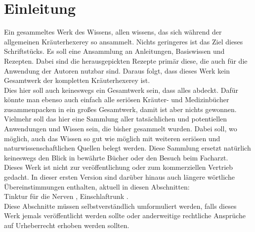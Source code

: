 \chapter{Einleitung}


Ein gesammeltes Werk des Wissens, allen wissens, das sich während der allgemeinen Kräuterhexerey so ansammelt. Nichts geringeres ist das Ziel dieses Schriftstücks. Es soll eine Ansammlung an Anleitungen, Basiswissen und Rezepten. Dabei sind die herausgepickten Rezepte primär diese, die auch für die Anwendung der Autoren nutzbar sind. Daraus folgt, dass dieses Werk kein Gesamtwerk der kompletten Kräuterhexerey ist.\\

Dies hier soll auch keineswegs ein Gesamtwerk sein, dass alles abdeckt. Dafür könnte man ebenso auch einfach alle seriösen Kräuter- und Medizinbücher zusammenpacken in ein großes Gesamtwerk, damit ist aber nichts gewonnen. Vielmehr soll das hier eine Sammlung aller tatsächlichen und potentiellen Anwendungen und Wissen sein, die bisher gesammelt wurden. Dabei soll, wo möglich, auch das Wissen so gut wie möglich mit weiteren seriösen und naturwissenschaftlichen Quellen belegt werden. Diese Sammlung ersetzt natürlich keineswegs den Blick in bewährte Bücher oder den Besuch beim Facharzt.\\

Dieses Werk ist nicht zur veröffentlichung oder zum kommerziellen Vertrieb gedacht. In dieser ersten Version sind darüber hinaus auch längere wörtliche Übereinstimmungen enthalten, aktuell in diesen Abschnitten: \\ Tinktur für die Nerven \cite{nedoma2018heiltinkturen}, Einschlaftrunk \cite{nedoma2018heiltinkturen}.\\ Diese Abschnitte müssen selbstverständlich umformuliert werden, falls dieses Werk jemals veröffentlicht werden sollte oder anderweitige rechtliche Ansprüche auf Urheberrecht erhoben werden sollten.
